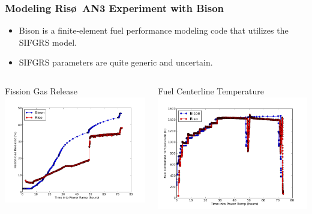 \documentclass{beamer}
\begin{document}
\begin{frame}
\frametitle{Modeling Ris\o~AN3 Experiment with Bison}

\begin{itemize}
  \item Bison is a finite-element fuel performance modeling code that utilizes the SIFGRS model.
  \item SIFGRS parameters are quite generic and uncertain. 
\end{itemize}

\begin{columns}
 \begin{column}{0.5\textwidth}
  \centering
  Fission Gas Release
  \includegraphics[width=1.\textwidth]{./fgr_comparison.png}
 \end{column}
 \begin{column}{0.5\textwidth}
  \centering
  Fuel Centerline Temperature
  \includegraphics[width=1.\textwidth]{./tc_temp_comparison.png}
 \end{column}
\end{columns}

\end{frame}
\end{document}
